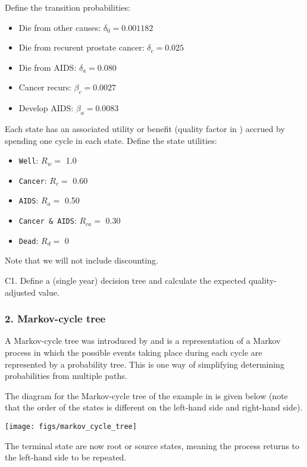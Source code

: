 \documentclass[]{book}
\providecommand{\tightlist}{%
  \setlength{\itemsep}{0pt}\setlength{\parskip}{0pt}}
\begin{document}
Define the transition probabilities:

\begin{itemize}
\tightlist
\item
  Die from other causes: \(\delta_0 = 0.001182\)
\item
  Die from recurent prostate cancer: \(\delta_c = 0.025\)
\item
  Die from AIDS: \(\delta_a = 0.080\)
\item
  Cancer recurs: \(\beta_c = 0.0027\)
\item
  Develop AIDS: \(\beta_a = 0.0083\)
\end{itemize}

Each state has an associated utility or benefit (quality factor in \citet{Hazen2014}) accrued by spending one cycle in each state.
Define the state utilities:

\begin{itemize}
\tightlist
\item
  \texttt{Well}: \(R_w=\) 1.0
\item
  \texttt{Cancer}: \(R_c=\) 0.60
\item
  \texttt{AIDS}: \(R_a=\) 0.50
\item
  \texttt{Cancer\ \&\ AIDS}: \(R_{ca}=\) 0.30
\item
  \texttt{Dead}: \(R_d=\) 0
\end{itemize}

Note that we will not include discounting.

C1. Define a (single year) decision tree and calculate the expected quality-adjusted value.

\hypertarget{C2}{%
\subsubsection{2. Markov-cycle tree}\label{C2}}

A Markov-cycle tree was introduced by \citet{Hollenberg1984} and is a representation of a Markov process in which the possible events taking place during each cycle are represented by a probability tree.
This is one way of simplifying determining probabilities from multiple paths.

The diagram for the Markov-cycle tree of the example in \citet{Hazen2014} is given below (note that the order of the states is different on the left-hand side and right-hand side).

\texttt{[image: figs/markov\_cycle\_tree]}

The terminal state are now root or source states, meaning the process returns to the left-hand side to be repeated.
\end{document}
